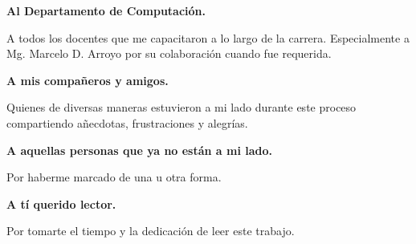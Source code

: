 \par \textbf{Al Departamento de Computación.}
\par A todos los docentes que me capacitaron a lo largo de la carrera. Especialmente a Mg. Marcelo D. Arroyo por su colaboración cuando fue requerida. \\

\par \textbf{A mis compañeros y amigos.}
\par Quienes de diversas maneras estuvieron a mi lado durante este proceso compartiendo añecdotas, frustraciones y alegrías. \\

\par \textbf{A aquellas personas que ya no están a mi lado.}
\par Por haberme marcado de una u otra forma. \\

\par \textbf{A tí querido lector.}
\par Por tomarte el tiempo y la dedicación de leer este trabajo. \\

\vskip 1cm
